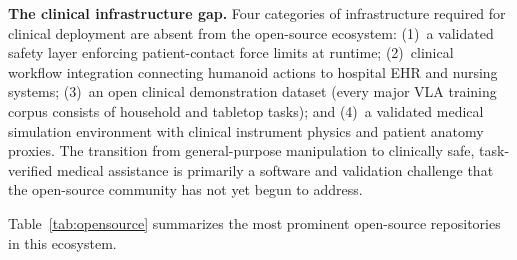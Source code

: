 \documentclass[acmsmall]{acmart}
\begin{document}
\textbf{The clinical infrastructure gap.} Four categories of infrastructure
required for clinical deployment are absent from the open-source ecosystem:
(1)~a validated safety layer enforcing patient-contact force limits at runtime;
(2)~clinical workflow integration connecting humanoid actions to hospital EHR
and nursing systems; (3)~an open clinical demonstration dataset (every major
VLA training corpus consists of household and tabletop tasks); and (4)~a validated
medical simulation environment with clinical instrument physics and patient
anatomy proxies. The transition from general-purpose manipulation to clinically
safe, task-verified medical assistance is primarily a software and validation
challenge that the open-source community has not yet begun to address.

Table~\ref{tab:opensource} summarizes the most prominent open-source repositories
in this ecosystem.
\end{document}
